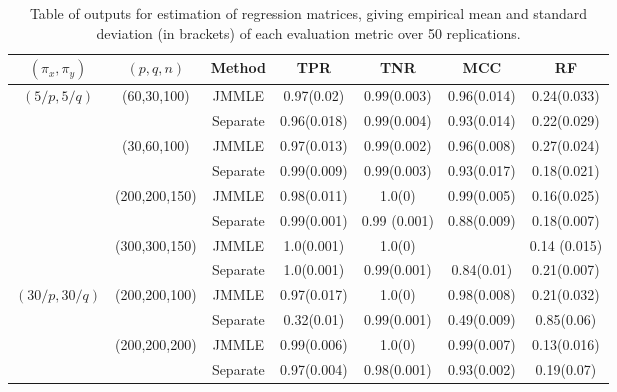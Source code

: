 \begin{scriptsize}
\begin{table}
    \begin{tabular}{ccccccc}
    \hline
    $(\pi_x, \pi_y)$ & $(p,q,n)$   & Method   & TPR            & TNR            & MCC & RF            \\ \hline
    $(5/p, 5/q)$   & (60,30,100)   & JMMLE    & 0.97(0.02)  & 0.99(0.003)  & 0.96(0.014) & 0.24(0.033) \\
    ~              & ~             & Separate & 0.96(0.018) & 0.99(0.004)  & 0.93(0.014) & 0.22(0.029) \\\cline{2-7}
    ~              & (30,60,100)   & JMMLE    & 0.97(0.013) & 0.99(0.002)  & 0.96(0.008) & 0.27(0.024) \\
    ~              & ~             & Separate & 0.99(0.009) & 0.99(0.003)  & 0.93(0.017) & 0.18(0.021) \\\cline{2-7}
    ~              & (200,200,150) & JMMLE    & 0.98(0.011) & 1.0(0)       & 0.99(0.005) & 0.16(0.025) \\
    ~              & ~             & Separate & 0.99(0.001) & 0.99 (0.001) & 0.88(0.009) & 0.18(0.007) \\\cline{2-7}
    ~              & (300,300,150) & JMMLE    & 1.0(0.001)  & 1.0(0)       & ~   & 0.14 (0.015)\\
    ~              & ~             & Separate & 1.0(0.001)  & 0.99(0.001)  & 0.84(0.01)  & 0.21(0.007)\\\hline
    $(30/p, 30/q)$ & (200,200,100) & JMMLE    & 0.97(0.017) & 1.0(0)       & 0.98(0.008) & 0.21(0.032) \\
    ~              & ~             & Separate & 0.32(0.01)  & 0.99(0.001)  & 0.49(0.009) & 0.85(0.06)  \\\cline{2-7}
    ~              & (200,200,200) & JMMLE    & 0.99(0.006) & 1.0(0)       & 0.99(0.007) & 0.13(0.016) \\
    ~              & ~             & Separate & 0.97(0.004) & 0.98(0.001)  & 0.93(0.002) & 0.19(0.07)  \\    \hline
    \end{tabular}
    \caption{Table of outputs for estimation of regression matrices, giving empirical mean and standard deviation (in brackets) of each evaluation metric over 50 replications.}
    \label{table:simtable11}
\end{table}


\end{scriptsize}
